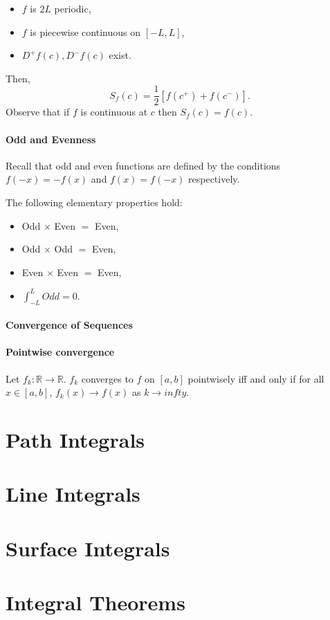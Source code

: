 \documentclass[12pt, letterpaper]{article}
\begin{document}
    \begin{itemize}
        \item \(f\) is \(2L\) periodic,
        \item \(f\) is piecewise continuous on \([-L, L]\),
        \item \(D^+f(c), D^-f(c)\) exist.
    \end{itemize}
    
    Then,
    \[
    S_f(c) = \frac{1}{2} [f(c^+) + f(c^-)].
    \]
    Observe that if \(f\) is continuous at \(c\) then \(S_f(c) = f(c)\).

    \paragraph{Odd and Evenness} 
    Recall that odd and even functions are defined by the conditions \(f(-x) = -f(x)\) and \(f(x) = f(-x)\) respectively.

    The following elementary properties hold:
    \begin{itemize}
        \item Odd \(\times\) Even \(=\) Even,
        \item Odd \(\times\) Odd \(=\) Even,
        \item Even \(\times\) Even \(=\) Even,
        \item \(\int_{-L}^L Odd = 0\).
    \end{itemize}

    \paragraph{Convergence of Sequences}
    
    \paragraph{Pointwise convergence}
    Let \(f_k: \mathbb{R} \to \mathbb{R}\). \(f_k\) converges to \(f\) on
    \([a, b]\) pointwisely iff and only if for all \(x\in[a,b]\),
    \(f_k(x)\to f(x)\) as \(k\to infty\).

    
    \section{Path Integrals}
    \section{Line Integrals}
    \section{Surface Integrals}
    \section{Integral Theorems}

    
    
    
    \section{}
\end{document}
